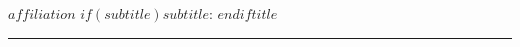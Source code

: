 
\thispagestyle{empty}

\begin{center}
\textsc{$affiliation$ $if(subtitle)$$subtitle$: $endif$$title$} \\
\noindent\rule{12cm}{0.4pt}
\end{center}

\vspace{2mm}